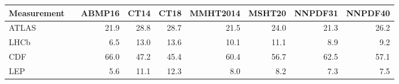 \begin{tabular}{l@{\extracolsep{\fill}}rrrrrrrr}
  \hline \hline
Measurement        &                &    ABMP16  &      CT14  &      CT18  &  MMHT2014  &    MSHT20  &   NNPDF31  &   NNPDF40 \\
\hline
                           ATLAS &     &    21.9  &    28.8  &    28.7  &    21.5  &    24.0  &    21.3  &    26.2 \\
                              LHCb  &     &     6.5  &    13.0  &    13.6  &    10.1  &    11.1  &     8.9  &     9.2 \\
                         CDF  &  &    66.0  &    47.2  &    45.4  &    60.4  &    56.7  &    62.5  &    57.1 \\
                               LEP    &    &     5.6  &    11.1  &    12.3  &     8.0  &     8.2  &     7.3  &     7.5 \\
\hline \hline 
\end{tabular}
